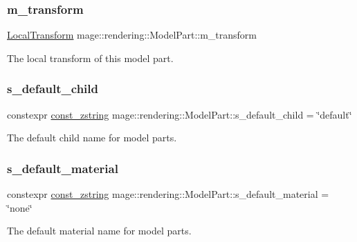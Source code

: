 \subsubsection{\texorpdfstring{m\+\_\+transform}{m\_transform}}
{\footnotesize\ttfamily \hyperlink{classmage_1_1_local_transform}{Local\+Transform} mage\+::rendering\+::\+Model\+Part\+::m\+\_\+transform}

The local transform of this model part. \hypertarget{structmage_1_1rendering_1_1_model_part_a3571b142c7948d7ab5af699799c69b42}{}\label{structmage_1_1rendering_1_1_model_part_a3571b142c7948d7ab5af699799c69b42} 
\subsubsection{\texorpdfstring{s\+\_\+default\+\_\+child}{s\_default\_child}}
{\footnotesize\ttfamily constexpr \hyperlink{namespacemage_abfd9206dc607ceb5d13ec68bf075a5c0}{const\+\_\+zstring} mage\+::rendering\+::\+Model\+Part\+::s\+\_\+default\+\_\+child = \char`\"{}default\char`\"{}\hspace{0.3cm}{\ttfamily [static]}}

The default child name for model parts. \hypertarget{structmage_1_1rendering_1_1_model_part_a833762db3fb81dd2086e9b89da158b12}{}\label{structmage_1_1rendering_1_1_model_part_a833762db3fb81dd2086e9b89da158b12} 
\subsubsection{\texorpdfstring{s\+\_\+default\+\_\+material}{s\_default\_material}}
{\footnotesize\ttfamily constexpr \hyperlink{namespacemage_abfd9206dc607ceb5d13ec68bf075a5c0}{const\+\_\+zstring} mage\+::rendering\+::\+Model\+Part\+::s\+\_\+default\+\_\+material = \char`\"{}none\char`\"{}\hspace{0.3cm}{\ttfamily [static]}}

The default material name for model parts. \hypertarget{structmage_1_1rendering_1_1_model_part_ab6747ba3fd20c9f55f1d9bb7a64033e5}{}\label{structmage_1_1rendering_1_1_model_part_ab6747ba3fd20c9f55f1d9bb7a64033e5} 
